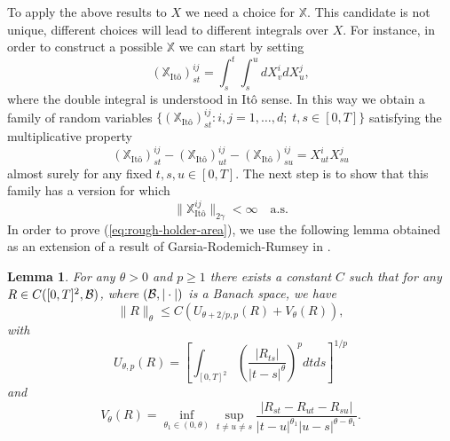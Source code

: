 \documentclass[a4paper,11pt]{article}
\newtheorem{lemma}[theorem]{Lemma}
\newcounter {constant}
\begin{document}
To apply the above results to $X$ we need a choice for $\mathbb{X}$. 
This candidate is not unique, different choices will lead to different 
integrals over $X$. For instance, in order to construct a possible 
$\mathbb{X}$ we can start by setting
$$
(\mathbb{X}_{\text{It\^o}})^{ij}_{st}=\int_s^t \int_s^u dX^i_v dX^j_u,
$$  
where the double integral is understood in It\^o sense. In this way we
obtain a family of random variables
$\{(\mathbb{X}_{\text{It\^o}})^{ij}_{st}: i,j=1,\dots,d; \; t,s
\in[0,T]\}$ satisfying the multiplicative property
\begin{equation*}
(\mathbb{X}_{\text{It\^o}})^{ij}_{st} - 
(\mathbb{X}_{\text{It\^o}})^{ij}_{ut} -
(\mathbb{X}_{\text{It\^o}})^{ij}_{su} 
= X^i_{ut} X^j_{su}   
\end{equation*}
almost surely for any fixed $t,s,u\in[0,T]$. The next step is to show 
that this family has a version for which
\begin{equation}
  \label{eq:rough-holder-area}
\|\mathbb{X}^{ij}_{\text{It\^o}}\|_{2\gamma} < \infty  \quad \mbox{a.s.}
\end{equation}
In order to prove (\ref{eq:rough-holder-area}), we use the following
lemma obtained as an extension of a result of Garsia-Rodemich-Rumsey 
in \cite{MR2091358}.
\begin{lemma}
\label{lemma:besov}
For any $\theta > 0$ and $p \ge 1$ there exists a constant $C$ such
that for any $R \in C([0,T]^2,{\cal B})$, where $({\cal B},|\cdot|)$ 
is a Banach space, we have 
\begin{equation}
\label{eq:generalboundxx}
\|R\|_{\theta} \le C \left(U_{\theta+2/p,p}(R)+V_\theta(R)\right),
\end{equation}
with
\begin{equation*}
 U_{\theta,p}(R) = \left[ \int_{[0,T]^2}
 \left(\frac{|R_{t s}|}{|t-s|^\theta}\right)^p dt ds \right]^{1/p}
\end{equation*}
and
\begin{equation*}
 V_\theta(R) = \inf_{\theta_1 \in(0,\theta)} \sup_{t \neq u \neq s} 
\frac{|R_{st}-R_{ut}-R_{su}|}{|t-u|^{\theta_1}|u-s|^{\theta-\theta_1}}. 
\end{equation*}
\end{lemma}
\end{document}
